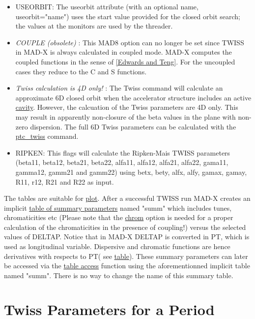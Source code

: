 \begin{itemize}
	\item USEORBIT: The useorbit attribute (with an optional name, useorbit="name") uses the start value provided for the closed orbit search; the values at the monitors are used by the threader.   
	\item \textit{ COUPLE (obsolete)} : This MAD8 option can no longer be set since TWISS in MAD-X is always calculated in coupled mode. MAD-X computes the coupled functions in the sense of \href{../Introduction/bibliography.html#edwards}{[Edwards and Teng]}. For the uncoupled cases they reduce to the C and S functions.   
	\item \textit{ Twiss calculation is 4D only!} : The Twiss command will calculate an approximate 6D closed orbit when the accelerator structure includes an active \href{../Introduction/cavity.html}{cavity}. However, the calcuation of the Twiss parameters are 4D only. This may result in apparently non-closure of the beta values in the plane with non-zero dispersion. The full 6D Twiss parameters can be calculated with the \href{../ptc_twiss/ptc_twiss.html}{ptc\_twiss} command.   
	\item RIPKEN: This flags will calculate the Ripken-Mais TWISS parameters (beta11, beta12, beta21, beta22, alfa11, alfa12, alfa21, alfa22, gama11, gamma12, gamm21 and gamm22) using betx, bety, alfx, alfy, gamax, gamay, R11, r12, R21 and R22 as input. 
\end{itemize}

The tables are suitable for \href{../plot/plot.html}{plot}.   After a successful TWISS run MAD-X creates an implicit \href{../Introduction/tables.html#summ}{table of summary parameters} named "summ" which includes tunes, chromaticities etc (Please note that the \href{../Introduction/tables.html#chrom}{chrom} option is needed  for a proper calculation of the chromaticities in the presence of coupling!) versus the selected values of DELTAP. Notice that in MAD-X DELTAP is converted in PT, which is used as longitudinal variable. Dispersive and chromatic functions are hence derivatives with respects to PT( see \href{../Introduction/tables.html#summ}{table}). These summary parameters can later be accessed via the \href{../Introduction/expression.html#table}{table access} function using the aforementionned implicit table named "summ". There is no way to change the name of this summary table. 

\section{Twiss Parameters for a Period}

